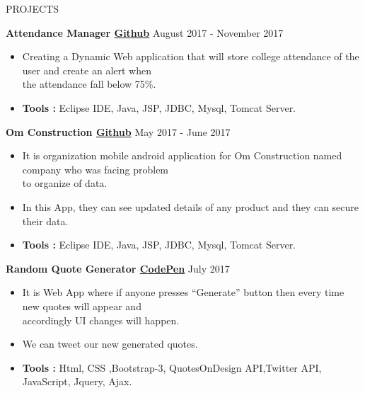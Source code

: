 \documentclass{resume} %
\begin{document}
\begin{rSection}{PROJECTS}

{\textbf{Attendance Manager  \href{https://github.com/geekabhi007/Attendance-Manager}{Github}}} \hfill August 2017 - November 2017{}{} 
\begin{itemize}
\item Creating a Dynamic Web application that will store college attendance of the user and create an alert when \\the attendance fall below 75\%.
\item \textbf{Tools :} Eclipse IDE, Java, JSP, JDBC, Mysql, Tomcat Server.
\end{itemize}


{\textbf{Om Construction \href{https://github.com/geekabhi007/OmConstruction}{Github}}} \hfill May 2017 - June 2017{}{} 
\begin{itemize}
\item It is organization mobile android application for Om Construction named company who was facing problem \\to organize of data.
\item In this App, they can see updated details of any product and they can secure their data.
\item \textbf{Tools :} Eclipse IDE, Java, JSP, JDBC, Mysql, Tomcat Server.
\end{itemize}


{\textbf{Random Quote Generator \href{https://codepen.io/geekabhi007/pen/RgqBZX}{CodePen} }} \hfill July 2017{}{} 
\begin{itemize}
\item It is Web App where if anyone presses “Generate” button then every time new quotes will appear and \\accordingly UI changes will happen.
\item We can tweet our new generated quotes. 
\item \textbf{Tools :}  Html, CSS ,Bootstrap-3, QuotesOnDesign API,Twitter API, JavaScript, Jquery, Ajax. 
\end{itemize}

\end{rSection} 

  

\end{document}
